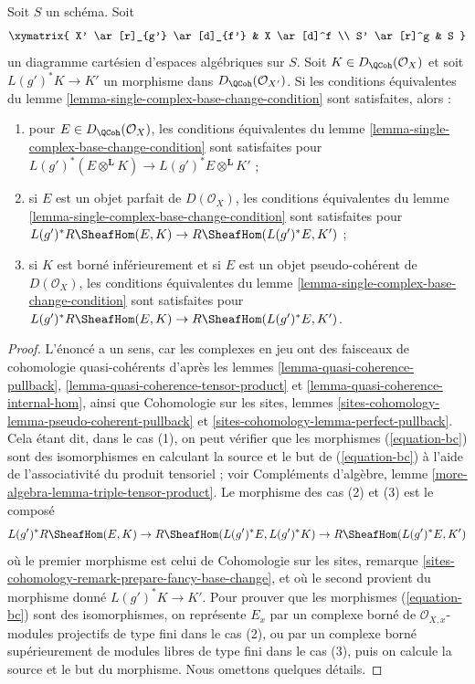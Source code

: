 \begin{lemma}
\label{lemma-single-complex-base-change-condition-inherited}
Soit $S$ un schéma. Soit
$$
\xymatrix{
X' \ar[r]_{g'} \ar[d]_{f'} &
X \ar[d]^f \\
S' \ar[r]^g &
S
}
$$
un diagramme cartésien d'espaces algébriques sur $S$.
Soit $K \in D_\QCoh(\mathcal{O}_X)$ et soit $L(g')^*K \to K'$
un morphisme dans $D_\QCoh(\mathcal{O}_{X'})$. Si les conditions équivalentes du
lemme \ref{lemma-single-complex-base-change-condition} sont satisfaites, alors :
\begin{enumerate}
\item pour $E \in D_\QCoh(\mathcal{O}_X)$, les conditions
équivalentes du lemme \ref{lemma-single-complex-base-change-condition} sont satisfaites
pour $L(g')^*(E \otimes^\mathbf{L} K) \to L(g')^*E \otimes^\mathbf{L} K'$ ;
\item si $E$ est un objet parfait de $D(\mathcal{O}_X)$, les conditions équivalentes du
lemme \ref{lemma-single-complex-base-change-condition} sont satisfaites pour
$L(g')^*R\SheafHom(E, K) \to R\SheafHom(L(g')^*E, K')$ ;
\item si $K$ est borné inférieurement et si $E$ est un objet pseudo-cohérent de
$D(\mathcal{O}_X)$, les conditions équivalentes du
lemme \ref{lemma-single-complex-base-change-condition} sont satisfaites pour
$L(g')^*R\SheafHom(E, K) \to R\SheafHom(L(g')^*E, K')$.
\end{enumerate}
\end{lemma}

\begin{proof}
L'énoncé a un sens, car les complexes en jeu ont des faisceaux de cohomologie
quasi-cohérents d'après les lemmes
\ref{lemma-quasi-coherence-pullback},
\ref{lemma-quasi-coherence-tensor-product} et
\ref{lemma-quasi-coherence-internal-hom}, ainsi que
Cohomologie sur les sites, lemmes
\ref{sites-cohomology-lemma-pseudo-coherent-pullback} et
\ref{sites-cohomology-lemma-perfect-pullback}.
Cela étant dit, dans le cas (1), on peut vérifier que les morphismes (\ref{equation-bc})
sont des isomorphismes en calculant la source et le but
de (\ref{equation-bc}) à l'aide de l'associativité du produit tensoriel ; voir
Compléments d'algèbre, lemme \ref{more-algebra-lemma-triple-tensor-product}.
Le morphisme des cas (2) et (3) est le composé
$$
L(g')^*R\SheafHom(E, K) \to R\SheafHom(L(g')^*E, L(g')^*K)
\to R\SheafHom(L(g')^*E, K')
$$
où le premier morphisme est celui de
Cohomologie sur les sites, remarque
\ref{sites-cohomology-remark-prepare-fancy-base-change},
et où le second provient du morphisme donné $L(g')^*K \to K'$.
Pour prouver que les morphismes (\ref{equation-bc}) sont des isomorphismes, on représente
$E_x$ par un complexe borné de $\mathcal{O}_{X, x}$-modules projectifs de type fini
dans le cas (2), ou par un complexe borné supérieurement de modules libres de type fini dans le cas (3),
puis on calcule la source et le but du morphisme.
Nous omettons quelques détails.
\end{proof}

